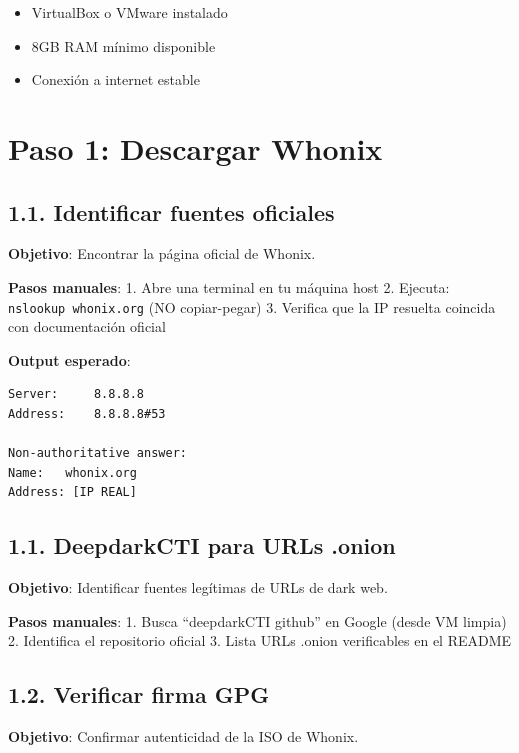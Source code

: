 \documentclass[
  letterpaper,
]{report}
\providecommand{\tightlist}{%
  \setlength{\itemsep}{0pt}\setlength{\parskip}{0pt}}
\begin{document}
\begin{itemize}
\tightlist
\item
  VirtualBox o VMware instalado
\item
  8GB RAM mínimo disponible
\item
  Conexión a internet estable
\end{itemize}

\section{Paso 1: Descargar Whonix}\label{paso-1-descargar-whonix}

\subsection{1.1. Identificar fuentes
oficiales}\label{identificar-fuentes-oficiales}

\textbf{Objetivo}: Encontrar la página oficial de Whonix.

\textbf{Pasos manuales}: 1. Abre una terminal en tu máquina host 2.
Ejecuta: \texttt{nslookup\ whonix.org} (NO copiar-pegar) 3. Verifica que
la IP resuelta coincida con documentación oficial

\textbf{Output esperado}:

\begin{verbatim}
Server:     8.8.8.8
Address:    8.8.8.8#53

Non-authoritative answer:
Name:   whonix.org
Address: [IP REAL]
\end{verbatim}

\subsection{1.1. DeepdarkCTI para URLs
.onion}\label{deepdarkcti-para-urls-.onion}

\textbf{Objetivo}: Identificar fuentes legítimas de URLs de dark web.

\textbf{Pasos manuales}: 1. Busca ``deepdarkCTI github'' en Google
(desde VM limpia) 2. Identifica el repositorio oficial 3. Lista URLs
.onion verificables en el README

\subsection{1.2. Verificar firma GPG}\label{verificar-firma-gpg}

\textbf{Objetivo}: Confirmar autenticidad de la ISO de Whonix.
\end{document}
